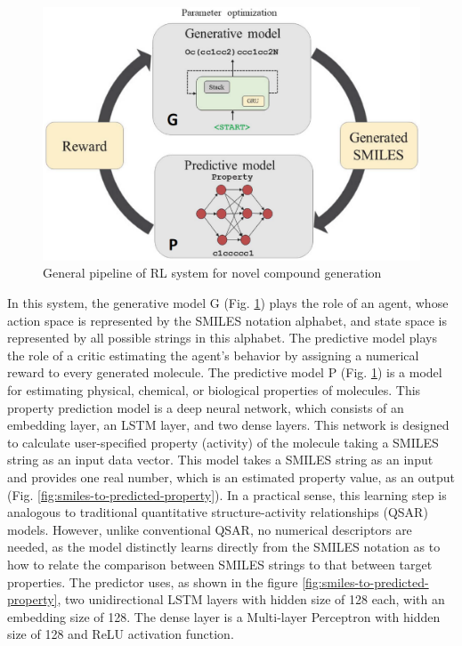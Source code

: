 \documentclass[a4paper]{article}
\begin{document}
\begin{figure}[htbp]
    \centering
        \includegraphics[width=\textwidth]{parameter-optimization.png}
    \caption{General pipeline of RL system for novel compound generation}
    \label{fig:parameter-optimization}
\end{figure}

In this system, the generative model G (Fig. \ref{fig:parameter-optimization}) plays the role of an agent, whose action space is represented by the SMILES notation alphabet, and state space is represented by all possible strings in this alphabet. The predictive model plays the role of a critic estimating the agent's behavior by assigning a numerical reward to every generated molecule. 
The predictive model P (Fig. \ref{fig:parameter-optimization}) is a model for estimating physical, chemical, or biological properties of molecules. This property prediction model is a deep neural network, which consists of an embedding layer, an LSTM layer, and two dense layers. This network is designed to calculate user-specified property (activity) of the molecule taking a SMILES string as an input data vector. This model takes a SMILES string as an input and provides one real number, which is an estimated property value, as an output (Fig. \ref{fig:smiles-to-predicted-property}). In a practical sense, this learning step is analogous to traditional  quantitative structure-activity relationships (QSAR) models. However, unlike conventional QSAR, no numerical descriptors are needed, as the model distinctly learns directly from the SMILES notation as to how to relate the comparison between SMILES strings to that between target properties. The predictor uses, as shown in the figure \ref{fig:smiles-to-predicted-property}, two unidirectional LSTM layers with hidden size of 128 each, with an embedding size of 128. The dense layer is a Multi-layer Perceptron with hidden size of 128 and ReLU activation function.
\end{document}
